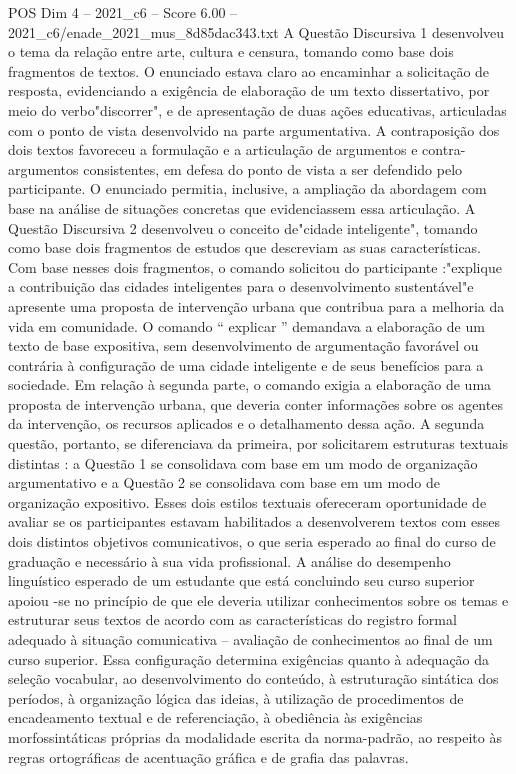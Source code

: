 \begin{textsample}{POS Dim 4 – 2021\_c6 – Score 6.00 – 2021\_c6/enade\_2021\_mus\_8d85dac343.txt}
A Questão Discursiva 1 desenvolveu o tema da relação entre arte, cultura e censura, tomando como base dois fragmentos de textos.
O enunciado estava claro ao encaminhar a solicitação de resposta, evidenciando a exigência de elaboração de um texto dissertativo, por meio do verbo"discorrer", e de apresentação de duas ações educativas, articuladas com o ponto de vista desenvolvido na parte argumentativa.
A contraposição dos dois textos favoreceu a formulação e a articulação de argumentos e contra-argumentos consistentes, em defesa do ponto de vista a ser defendido pelo participante.
O enunciado permitia, inclusive, a ampliação da abordagem com base na análise de situações concretas que evidenciassem essa articulação.
A Questão Discursiva 2 desenvolveu o conceito de"cidade inteligente", tomando como base dois fragmentos de estudos que descreviam as suas características.
Com base nesses dois fragmentos, o comando solicitou do participante :"explique a contribuição das cidades inteligentes para o desenvolvimento sustentável"e apresente uma proposta de intervenção urbana que contribua para a melhoria da vida em comunidade.
O comando “ explicar ” demandava a elaboração de um texto de base expositiva, sem desenvolvimento de argumentação favorável ou contrária à configuração de uma cidade inteligente e de seus benefícios para a sociedade.
Em relação à segunda parte, o comando exigia a elaboração de uma proposta de intervenção urbana, que deveria conter informações sobre os agentes da intervenção, os recursos aplicados e o detalhamento dessa ação.
A segunda questão, portanto, se diferenciava da primeira, por solicitarem estruturas textuais distintas : a Questão 1 se consolidava com base em um modo de organização argumentativo e a Questão 2 se consolidava com base em um modo de organização expositivo.
Esses dois estilos textuais ofereceram oportunidade de avaliar se os participantes estavam habilitados a desenvolverem textos com esses dois distintos objetivos comunicativos, o que seria esperado ao final do curso de graduação e necessário à sua vida profissional.
A análise do desempenho linguístico esperado de um estudante que está concluindo seu curso superior apoiou -se no princípio de que ele deveria utilizar conhecimentos sobre os temas e estruturar seus textos de acordo com as características do registro formal adequado à situação comunicativa – avaliação de conhecimentos ao final de um curso superior.
Essa configuração determina exigências quanto à adequação da seleção vocabular, ao desenvolvimento do conteúdo, à estruturação sintática dos períodos, à organização lógica das ideias, à utilização de procedimentos de encadeamento textual e de referenciação, à obediência às exigências morfossintáticas próprias da modalidade escrita da norma-padrão, ao respeito às regras ortográficas de acentuação gráfica e de grafia das palavras.

\end{textsample}
